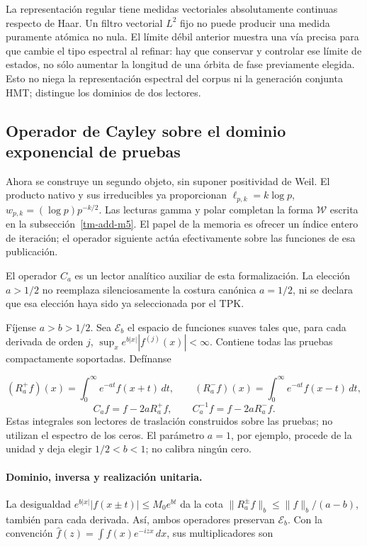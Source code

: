 La representación regular tiene medidas vectoriales absolutamente continuas respecto de Haar. Un filtro vectorial \(L^2\) fijo no puede producir una medida puramente atómica no nula. El límite débil anterior muestra una vía precisa para que cambie el tipo espectral al refinar: hay que conservar y controlar ese límite de estados, no sólo aumentar la longitud de una órbita de fase previamente elegida. Esto no niega la representación espectral del corpus ni la generación conjunta HMT; distingue los dominios de dos lectores.


\subsection{Operador de Cayley sobre el dominio exponencial de pruebas}
\label{tm-add-m4}
Ahora se construye un segundo objeto, sin suponer positividad de Weil. El producto nativo y sus irreducibles ya proporcionan \(\ell_{p,k}=k\log p\), \(w_{p,k}=(\log p)p^{-k/2}\). Las lecturas gamma y polar completan la forma \(\mathscr W\) escrita en la subsección~\ref{tm-add-m5}. El papel de la memoria es ofrecer un índice entero de iteración; el operador siguiente actúa efectivamente sobre las funciones de esa publicación.

El operador \(C_a\) es un lector analítico auxiliar de esta formalización. La elección \(a>1/2\) no reemplaza silenciosamente la costura canónica \(a=1/2\), ni se declara que esa elección haya sido ya seleccionada por el TPK.

Fíjense \(a>b>1/2\). Sea \(\mathscr E_b\) el espacio de funciones suaves tales que, para cada derivada de orden \(j\), \(\sup_x e^{b|x|}|f^{(j)}(x)|<\infty\). Contiene todas las pruebas compactamente soportadas. Defínanse

\[
(R_a^+f)(x)=\int_0^\infty e^{-at}f(x+t)\,dt,
\qquad
(R_a^-f)(x)=\int_0^\infty e^{-at}f(x-t)\,dt,
\]
\[
\boxed{C_af=f-2aR_a^+f,\qquad C_a^{-1}f=f-2aR_a^-f.}
\]
Estas integrales son lectores de traslación construidos sobre las pruebas; no utilizan el espectro de los ceros. El parámetro \(a=1\), por ejemplo, procede de la unidad y deja elegir \(1/2<b<1\); no calibra ningún cero.

\paragraph{Dominio, inversa y realización unitaria.} La desigualdad \(e^{b|x|}|f(x\pm t)|\le M_0e^{bt}\) da la cota \(\|R_a^\pm f\|_b\le\|f\|_b/(a-b)\), también para cada derivada. Así, ambos operadores preservan \(\mathscr E_b\). Con la convención \(\widehat f(z)=\int f(x)e^{-izx}\,dx\), sus multiplicadores son

